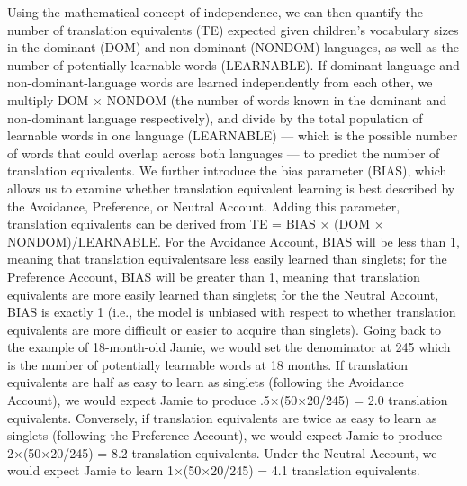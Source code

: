\documentclass[
  english,
  ,man,floatsintext]{apa6}
\begin{document}
Using the mathematical concept of independence, we can then quantify the number of translation equivalents (TE) expected given children's vocabulary sizes in the dominant (DOM) and non-dominant (NONDOM) languages, as well as the number of potentially learnable words (LEARNABLE). If dominant-language and non-dominant-language words are learned independently from each other, we multiply DOM × NONDOM (the number of words known in the dominant and non-dominant language respectively), and divide by the total population of learnable words in one language (LEARNABLE) --- which is the possible number of words that could overlap across both languages --- to predict the number of translation equivalents. We further introduce the bias parameter (BIAS), which allows us to examine whether translation equivalent learning is best described by the Avoidance, Preference, or Neutral Account. Adding this parameter, translation equivalents can be derived from TE = BIAS × (DOM × NONDOM)/LEARNABLE. For the Avoidance Account, BIAS will be less than 1, meaning that translation equivalentsare less easily learned than singlets; for the Preference Account, BIAS will be greater than 1, meaning that translation equivalents are more easily learned than singlets; for the the Neutral Account, BIAS is exactly 1 (i.e., the model is unbiased with respect to whether translation equivalents are more difficult or easier to acquire than singlets). Going back to the example of 18-month-old Jamie, we would set the denominator at 245 which is the number of potentially learnable words at 18 months. If translation equivalents are half as easy to learn as singlets (following the Avoidance Account), we would expect Jamie to produce .5×(50×20/245) = 2.0 translation equivalents. Conversely, if translation equivalents are twice as easy to learn as singlets (following the Preference Account), we would expect Jamie to produce 2×(50×20/245) = 8.2 translation equivalents. Under the Neutral Account, we would expect Jamie to learn 1×(50×20/245) = 4.1 translation equivalents.
\end{document}

